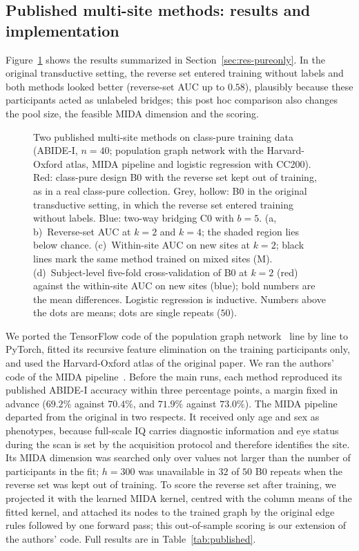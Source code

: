 \subsection{Published multi-site methods: results and implementation}

Figure~\ref{fig:published} shows the results summarized in Section~\ref{sec:res-pureonly}. In the original transductive setting, the reverse set entered training without labels and both methods looked better (reverse-set AUC up to $0.58$), plausibly because these participants acted as unlabeled bridges; this post hoc comparison also changes the pool size, the feasible MIDA dimension and the scoring.

\begin{figure}[!htbp]
\centering
{}
\caption{Two published multi-site methods on class-pure training data (ABIDE-I, $n=40$; population graph network with the Harvard-Oxford atlas, MIDA pipeline and logistic regression with CC200). Red: class-pure design B0 with the reverse set kept out of training, as in a real class-pure collection. Grey, hollow: B0 in the original transductive setting, in which the reverse set entered training without labels. Blue: two-way bridging C0 with $b=5$. (a, b)~Reverse-set AUC at $k=2$ and $k=4$; the shaded region lies below chance. (c)~Within-site AUC on new sites at $k=2$; black lines mark the same method trained on mixed sites (M). (d)~Subject-level five-fold cross-validation of B0 at $k=2$ (red) against the within-site AUC on new sites (blue); bold numbers are the mean differences. Logistic regression is inductive. Numbers above the dots are means; dots are single repeats ($50$).}
\label{fig:published}
\end{figure}

We ported the TensorFlow code of the population graph network~\cite{parisot2018} line by line to PyTorch, fitted its recursive feature elimination on the training participants only, and used the Harvard-Oxford atlas of the original paper. We ran the authors' code of the MIDA pipeline~\cite{kunda2023}. Before the main runs, each method reproduced its published ABIDE-I accuracy within three percentage points, a margin fixed in advance ($69.2\%$ against $70.4\%$, and $71.9\%$ against $73.0\%$). The MIDA pipeline departed from the original in two respects. It received only age and sex as phenotypes, because full-scale IQ carries diagnostic information and eye status during the scan is set by the acquisition protocol and therefore identifies the site. Its MIDA dimension was searched only over values not larger than the number of participants in the fit; $h=300$ was unavailable in $32$ of $50$ B0 repeats when the reverse set was kept out of training. To score the reverse set after training, we projected it with the learned MIDA kernel, centred with the column means of the fitted kernel, and attached its nodes to the trained graph by the original edge rules followed by one forward pass; this out-of-sample scoring is our extension of the authors' code. Full results are in Table~\ref{tab:published}.

